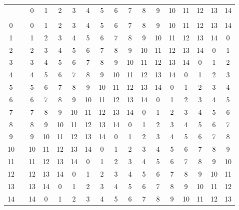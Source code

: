 \begin{footnotesize}
\begin{tabular}
    {c@{ }c@{ }c@{ }c@{ }c@{ }c@{ }c@{ }c@{ }c@{ }c@{ }c@{ }c@{ }c@{ }c@{ }c@{ }c@{ }c}
        & \phantom{X}
             &  0 &  1 &  2 &  3 &  4 &  5 &  6 &  7 &  8 &  9 & 10 & 11 & 12 & 13 & 14 \\
        &    &    &    &    &    &    &    &    &    &    &    &    &    &    &    &    \\
    0   &    &  0 &  1 &  2 &  3 &  4 &  5 &  6 &  7 &  8 &  9 & 10 & 11 & 12 & 13 & 14 \\
    1   &    &  1 &  2 &  3 &  4 &  5 &  6 &  7 &  8 &  9 & 10 & 11 & 12 & 13 & 14 &  0 \\
    2   &    &  2 &  3 &  4 &  5 &  6 &  7 &  8 &  9 & 10 & 11 & 12 & 13 & 14 &  0 &  1 \\
    3   &    &  3 &  4 &  5 &  6 &  7 &  8 &  9 & 10 & 11 & 12 & 13 & 14 &  0 &  1 &  2 \\
    4   &    &  4 &  5 &  6 &  7 &  8 &  9 & 10 & 11 & 12 & 13 & 14 &  0 &  1 &  2 &  3 \\
    5   &    &  5 &  6 &  7 &  8 &  9 & 10 & 11 & 12 & 13 & 14 &  0 &  1 &  2 &  3 &  4 \\
    6   &    &  6 &  7 &  8 &  9 & 10 & 11 & 12 & 13 & 14 &  0 &  1 &  2 &  3 &  4 &  5 \\
    7   &    &  7 &  8 &  9 & 10 & 11 & 12 & 13 & 14 &  0 &  1 &  2 &  3 &  4 &  5 &  6 \\
    8   &    &  8 &  9 & 10 & 11 & 12 & 13 & 14 &  0 &  1 &  2 &  3 &  4 &  5 &  6 &  7 \\
    9   &    &  9 & 10 & 11 & 12 & 13 & 14 &  0 &  1 &  2 &  3 &  4 &  5 &  6 &  7 &  8 \\
   10   &    & 10 & 11 & 12 & 13 & 14 &  0 &  1 &  2 &  3 &  4 &  5 &  6 &  7 &  8 &  9 \\
   11   &    & 11 & 12 & 13 & 14 &  0 &  1 &  2 &  3 &  4 &  5 &  6 &  7 &  8 &  9 & 10 \\
   12   &    & 12 & 13 & 14 &  0 &  1 &  2 &  3 &  4 &  5 &  6 &  7 &  8 &  9 & 10 & 11 \\
   13   &    & 13 & 14 &  0 &  1 &  2 &  3 &  4 &  5 &  6 &  7 &  8 &  9 & 10 & 11 & 12 \\
   14   &    & 14 &  0 &  1 &  2 &  3 &  4 &  5 &  6 &  7 &  8 &  9 & 10 & 11 & 12 & 13 \\
\end{tabular}
\end{footnotesize}
